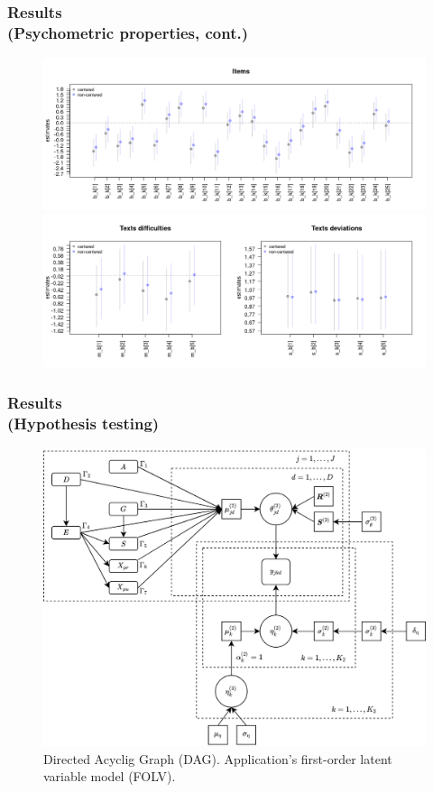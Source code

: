 \documentclass[arial,12pt,xcolor=dvipsnames]{beamer}
\begin{document}
\begin{frame}
	\frametitle{Results \\
		(Psychometric properties, cont.)}
	\begin{figure}[H]
		\centering
			\includegraphics[width=0.9\linewidth]{FOLV_recovery_items}
			\includegraphics[width=0.87\linewidth]{FOLV_recovery_texts}
		\label{fig:FOLV_CE.NC_recovery}
	\end{figure}
\end{frame}
%
\begin{frame}
	\frametitle{Results \\
		(Hypothesis testing)}
	\begin{figure}[H]
		\centering
		\includegraphics[width=0.7\linewidth]{app_FOLV_dag}
		\caption{Directed Acyclig Graph (DAG). Application's first-order latent variable model (FOLV).}
		\label{fig:FOLV_app}
	\end{figure}
\end{frame}
\end{document}
